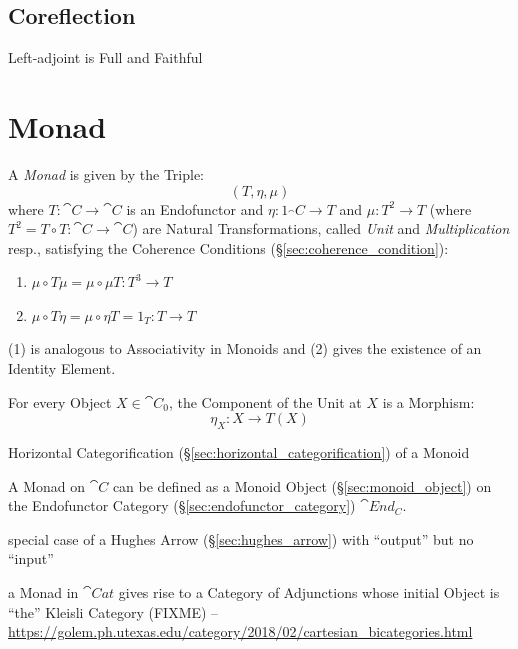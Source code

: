 \subsection{Coreflection}\label{sec:coreflection_adjunction}

\cite{winskel-nielsen93}

Left-adjoint is Full and Faithful



\section{Monad}\label{sec:monad}

A \emph{Monad} is given by the Triple:
\[
  (T, \eta, \mu)
\]
where $T : \cat{C} \rightarrow \cat{C}$ is an Endofunctor and $\eta :
1_\cat{C} \rightarrow T$ and $\mu : T^2 \rightarrow T$ (where $T^2 = T
\circ T : \cat{C} \rightarrow \cat{C}$) are Natural Transformations,
called \emph{Unit} and \emph{Multiplication} resp., satisfying the
Coherence Conditions (\S\ref{sec:coherence_condition}):
\begin{enumerate}
  \item $\mu \circ T\mu = \mu \circ \mu T : T^3 \rightarrow T$
  \item $\mu \circ T\eta = \mu \circ \eta T = 1_T : T \rightarrow T$
\end{enumerate}
(1) is analogous to Associativity in Monoids and (2) gives the
existence of an Identity Element.

For every Object $X \in \cat{C}_0$, the Component of the Unit at $X$
is a Morphism:
\[
  \eta_X : X \rightarrow T (X)
\]

Horizontal Categorification (\S\ref{sec:horizontal_categorification})
of a Monoid

A Monad on $\cat{C}$ can be defined as a Monoid Object
(\S\ref{sec:monoid_object}) on the Endofunctor Category
(\S\ref{sec:endofunctor_category}) $\cat{End_C}$.

special case of a Hughes Arrow (\S\ref{sec:hughes_arrow}) with
``output'' but no ``input''

a Monad in $\cat{Cat}$ gives rise to a Category of Adjunctions whose initial
Object is ``the'' Kleisli Category (FIXME)
--\url{https://golem.ph.utexas.edu/category/2018/02/cartesian_bicategories.html}

